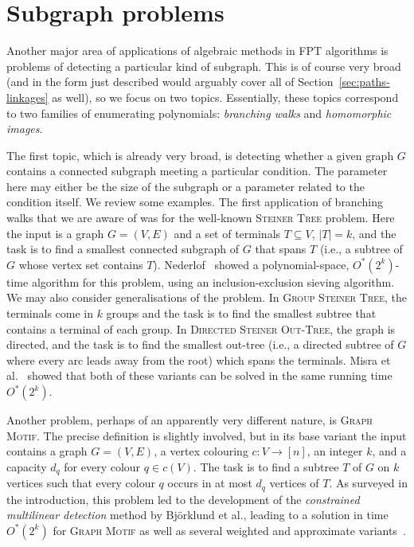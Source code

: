 \documentclass{theoretics}
\begin{document}
\section{Subgraph problems}
\label{sec:subgraphs}

Another major area of applications of algebraic methods in FPT
algorithms is problems of detecting a particular kind of subgraph. 
This is of course very broad (and in the form just described would
arguably cover all of Section~\ref{sec:paths-linkages} as well),
so we focus on two topics. Essentially, these topics correspond to two
families of enumerating polynomials: \emph{branching walks} and
\emph{homomorphic images}. 

The first topic, which is already very broad, is detecting whether a
given graph $G$ contains a connected subgraph meeting a particular
condition. The parameter here may either be the size of the subgraph
or a parameter related to the condition itself. We review some
examples. The first application of branching walks that we are aware
of was for the well-known \textsc{Steiner Tree} problem.
Here the input is a graph $G=(V,E)$ and a set of terminals $T \subseteq V$, $|T|=k$,
and the task is to find a smallest connected subgraph of $G$ that
spans $T$ (i.e., a subtree of $G$ whose vertex set contains $T$).
Nederlof~\cite{Nederlof13algorithmica} showed a polynomial-space,
$O^*(2^k)$-time algorithm for this problem, using an inclusion-exclusion
sieving algorithm. We may also consider generalisations of the problem.
In \textsc{Group Steiner Tree}, the terminals come in $k$ groups and
the task is to find the smallest subtree that contains a terminal of
each group. In \textsc{Directed Steiner Out-Tree}, the graph is
directed, and the task is to find the smallest out-tree (i.e., a
directed subtree of $G$ where every arc leads away from the root)
which spans the terminals. Misra et al.~\cite{MisraPRSS12} showed that both of these
variants can be solved in the same running time $O^*(2^k)$.

Another problem, perhaps of an apparently very different nature, is
\textsc{Graph Motif}. The precise definition is slightly involved,
but in its base variant the input contains a graph $G=(V,E)$,
a vertex colouring $c \colon V \to [n]$, an integer $k$,
and a capacity $d_q$ for every colour $q \in c(V)$.
The task is to find a subtree $T$ of $G$ on $k$ vertices such that
every colour $q$ occurs in at most $d_q$ vertices of $T$. 
As surveyed in the introduction, this problem led to the development
of the \emph{constrained multilinear detection} method by Björklund et
al., leading to a solution in time $O^*(2^k)$ for \textsc{Graph Motif}
as well as several weighted and approximate variants~\cite{BjorklundKK16}.
\end{document}
